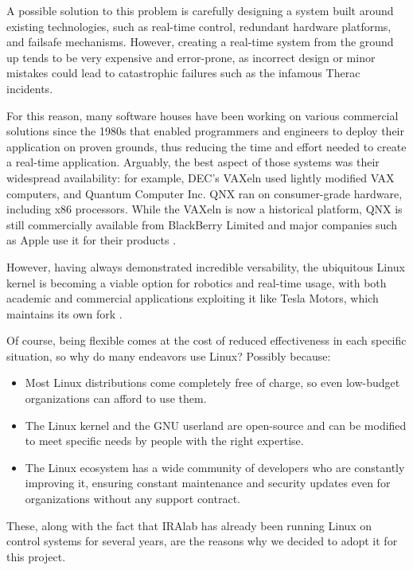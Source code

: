 \documentclass[a4paper,12pt]{report}
\begin{document}
A possible solution to this problem is carefully designing a system built around existing technologies, such as real-time control, redundant hardware platforms, and failsafe mechanisms. However, creating a real-time system from the ground up tends to be very expensive and error-prone, as incorrect design or minor mistakes could lead to catastrophic failures such as the infamous Therac \cite{therac-25-accidents} incidents.

For this reason, many software houses have been working on various commercial solutions since the 1980s that enabled programmers and engineers to deploy their application on proven grounds, thus reducing the time and effort needed to create a real-time application. Arguably, the best aspect of those systems was their widespread availability: for example, DEC's VAXeln used lightly modified VAX computers, and Quantum Computer Inc. QNX ran on consumer-grade hardware, including x86 processors. While the VAXeln is now a historical platform, QNX is still commercially available from BlackBerry Limited and major companies such as Apple use it for their products \cite{time-carplay-qnx}.

However, having always demonstrated incredible versability, the ubiquitous Linux kernel is becoming a viable option for robotics and real-time usage, with both academic and commercial applications exploiting it like Tesla Motors, which maintains its own fork \cite{gh-tesla-linux}.

Of course, being flexible comes at the cost of reduced effectiveness in each specific situation, so why do many endeavors use Linux? Possibly because:
\begin{itemize}
  \item Most Linux distributions come completely free of charge, so even low-budget organizations can afford to use them.
  \item The Linux kernel and the GNU userland are open-source and can be modified to meet specific needs by people with the right expertise.
  \item The Linux ecosystem has a wide community of developers who are constantly improving it, ensuring constant maintenance and security updates even for organizations without any support contract.
\end{itemize}

These, along with the fact that IRAlab has already been running Linux on control systems for several years, are the reasons why we decided to adopt it for this project.
\end{document}
